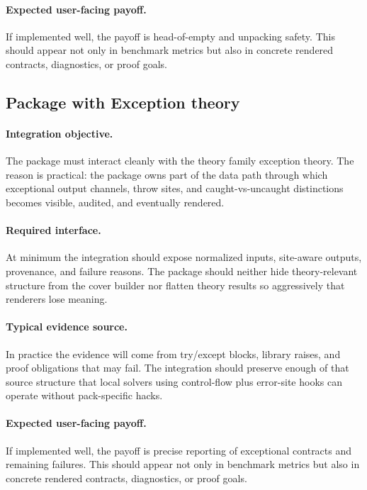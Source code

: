 \documentclass[11pt]{report}
\DeclareRobustCommand{\py}[1]{\texttt{\detokenize{#1}}}
\theoremstyle{definition}
\theoremstyle{plain}
\begin{document}
\paragraph{Expected user-facing payoff.}
If implemented well, the payoff is head-of-empty and unpacking safety. This should appear not only
in benchmark metrics but also in concrete rendered contracts,
diagnostics, or proof goals.


\subsection{Package \py{src/deppy/assist} with Exception theory}

\paragraph{Integration objective.}
The package \py{src/deppy/assist} must interact cleanly with the
theory family exception theory. The reason is practical: the
package owns part of the data path through which exceptional output channels, throw sites, and caught-vs-uncaught distinctions becomes
visible, audited, and eventually rendered.

\paragraph{Required interface.}
At minimum the integration should expose normalized inputs, site-aware
outputs, provenance, and failure reasons. The package should neither hide
theory-relevant structure from the cover builder nor flatten theory
results so aggressively that renderers lose meaning.

\paragraph{Typical evidence source.}
In practice the evidence will come from try/except blocks, library raises, and proof obligations that may fail. The integration should
preserve enough of that source structure that local solvers using control-flow plus error-site hooks
can operate without pack-specific hacks.

\paragraph{Expected user-facing payoff.}
If implemented well, the payoff is precise reporting of exceptional contracts and remaining failures. This should appear not only
in benchmark metrics but also in concrete rendered contracts,
diagnostics, or proof goals.
\end{document}
